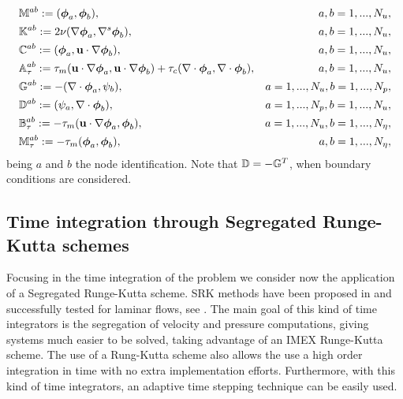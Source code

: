 \begin{align*}
&\mathbb{M}^{ab}:=(\boldsymbol{\phi}_{a},\boldsymbol{\phi}_{b}),&a,b=1,...,N_u,\\
&\mathbb{K}^{ab}:=2\nu(\nabla\boldsymbol{\phi}_{a},\nabla^s\boldsymbol{\phi}_{b}),&a,b=1,...,N_u,\\
&\mathbb{C}^{ab}:=(\boldsymbol{\phi}_{a},{\bf u}\cdot\nabla\boldsymbol{\phi}_{b}),&a,b=1,...,N_u,\\
&\mathbb{A}_{\tau}^{ab}:=\tau_m({\bf u}\cdot\nabla\boldsymbol{\phi}_{a},{\bf u}\cdot\nabla\boldsymbol{\phi}_{b})+\tau_c(\nabla\cdot\boldsymbol{\phi}_{a},\nabla\cdot\boldsymbol{\phi}_{b}),&a,b=1,...,N_u,\\
&\mathbb{G}^{ab}:=-(\nabla\cdot\boldsymbol{\phi}_{a},\psi_{b}),&a=1,...,N_u,b=1,...,N_p,\\
&\mathbb{D}^{ab}:=(\psi_{a},\nabla\cdot\boldsymbol{\phi}_{b}),&a=1,...,N_p,b=1,...,N_u,\\
&\mathbb{B}_{\tau}^{ab}:=-\tau_m({\bf u}\cdot\nabla\boldsymbol{\phi}_{a},\boldsymbol{\phi}_{b}),&a=1,...,N_u,b=1,...,N_\eta,\\
&\mathbb{M}_{\tau}^{ab}:=-\tau_m(\boldsymbol{\phi}_{a},\boldsymbol{\phi}_{b}),&a,b=1,...,N_\eta,
\end{align*}
being $a$ and $b$ the node identification. Note that $\mathbb{D}=-\mathbb{G}^T$, when boundary conditions are considered.

\subsection{Time integration through Segregated Runge-Kutta schemes}
\label{subsec:C7_SRK}
Focusing in the time integration of the problem  we consider now the application of a Segregated Runge-Kutta scheme. SRK methods have been proposed in \cite{colomes_segregated_2015} and successfully tested for laminar flows, see . The main goal of this kind of time integrators is the segregation of velocity and pressure computations, giving systems much easier to be solved, taking advantage of an IMEX Runge-Kutta scheme. The use of a Rung-Kutta scheme also allows the use a high order integration in time with no extra implementation efforts. Furthermore, with this kind of time integrators, an adaptive time stepping technique can be easily used.

